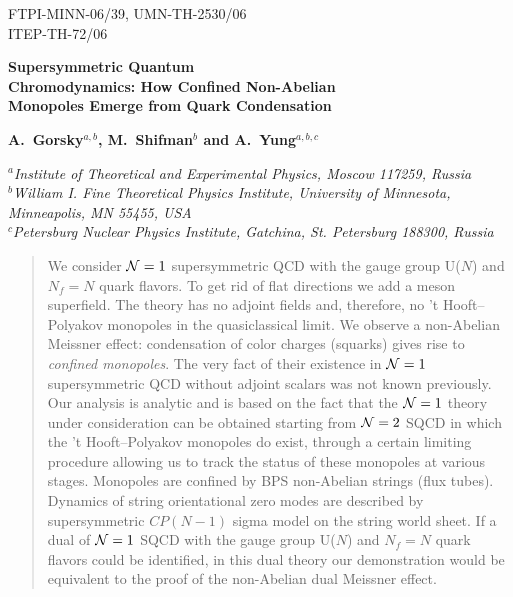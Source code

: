 \documentclass[epsfig,12pt]{article}
\newcommand{\none}{${\cal N}=1\;$}
\begin{document}

\begin{titlepage}

\begin{flushright}
FTPI-MINN-06/39, UMN-TH-2530/06\\
ITEP-TH-72/06\\
\end{flushright}

\begin{center}

{\Large \bf   
\boldmath{\none} Supersymmetric Quantum  \\[1mm]
Chromodynamics: How Confined Non-Abelian
 \\[4mm]
 Monopoles Emerge from  Quark Condensation 
 }
\end{center}

\vspace{3mm}

\begin{center}
{\bf A.~Gorsky$^{a,b}$,
\bf M.~Shifman$^{b}$ and \bf A.~Yung$^{a,b,c}$}
\end {center}
\vspace{0.3cm}
\begin{center}

$^a${\it Institute of Theoretical and Experimental Physics, Moscow
117259, Russia}\\
$^b${\it  William I. Fine Theoretical Physics Institute,
University of Minnesota,
Minneapolis, MN 55455, USA}\\
$^{c}${\it Petersburg Nuclear Physics Institute, Gatchina, St. Petersburg
188300, Russia}

\end{center}

\begin{abstract}

We consider ${\cal N} =1$ supersymmetric QCD with the gauge group U($N$) 
and $N_f=N$ quark flavors. To get rid of flat directions we add a meson superfield.
The theory has no adjoint fields and, therefore,  no 't Hooft--Polyakov monopoles
in the quasiclassical limit. We observe a non-Abelian Meissner effect:
condensation of color charges (squarks) gives rise to 
{\em confined monopoles}. The very fact of their existence in ${\cal N} =1$ supersymmetric QCD without adjoint scalars was not known previously.
Our analysis is analytic and is based on the fact that the ${\cal N} =1$ 
theory under consideration can be obtained starting from ${\cal N} =2$ SQCD 
in which the 't Hooft--Polyakov monopoles do exist, through a certain 
limiting procedure allowing us to track the status  of these 
monopoles at various stages. Monopoles are confined by
BPS non-Abelian strings (flux tubes). Dynamics of string orientational
zero modes are described by supersymmetric $CP(N-1)$ sigma model
on the string world sheet. 
If a dual of ${\cal N} =1$ SQCD with the gauge group U($N$) and 
$N_f=N$ quark flavors could be identified, in this dual theory our demonstration
would be equivalent to the proof of the non-Abelian dual Meissner effect.



\end{abstract}
\end{titlepage}
\end{document}
